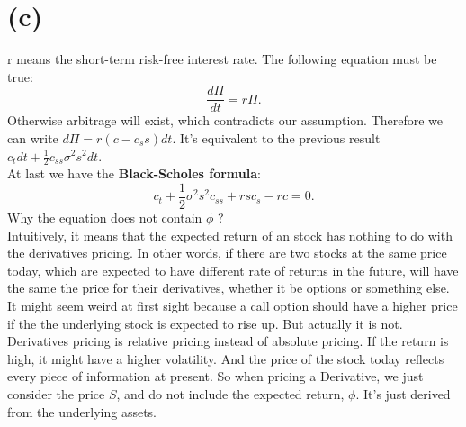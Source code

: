 \documentclass[12pt,a4paper]{paper}
\begin{document}
\section{(c)}
\indent r means the short-term risk-free interest rate. The following equation must be true:
\begin{equation}
\frac{d\Pi}{dt}=r\Pi.
\end{equation}
\indent Otherwise arbitrage will exist, which contradicts our assumption. Therefore we can write $d\Pi = r(c - c_s s)dt$. It's equivalent to the previous result $c_t dt + \frac{1}{2} c_{ss} \sigma^2 s^2 dt$.\\
\indent At last we have the \textbf{Black-Scholes formula}:
\begin{equation}
c_t + \frac{1}{2}\sigma^2 s^2 c_{ss} + rsc_s - rc = 0.
\end{equation}
\indent Why the equation does not contain $\phi$ ? \\
\indent Intuitively, it means that the expected return of an stock has nothing to do with the derivatives pricing. In other words, if there are two stocks at the same price today, which are expected to have different rate of returns in the future, will have the same the price for their derivatives, whether it be options or something else. It might seem weird at first sight because a call option should have a higher price if the the underlying stock is expected to rise up. But actually it is not. Derivatives pricing is relative pricing instead of absolute pricing. If the return is high, it might have a higher volatility. And the price of the stock today reflects every piece of information at present. So when pricing a Derivative, we just consider the price $S$, and do not include the expected return, $\phi$. It's just derived from the underlying assets.
\end{document}
